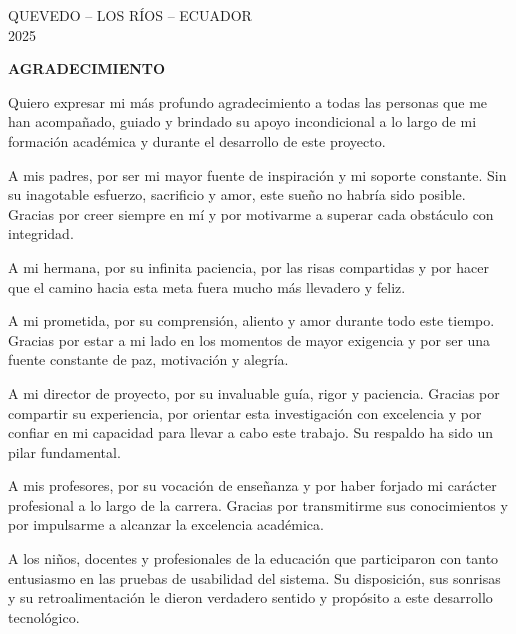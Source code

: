 \documentclass[12pt,a4paper,oneside]{report}
\begin{document}
\vspace{1.5cm}
\begin{center}
    QUEVEDO -- LOS RÍOS -- ECUADOR\\[0.3cm]
    2025
\end{center}

\newpage

\begin{center}
    \vspace*{0.5cm}
    {\bfseries AGRADECIMIENTO}
\end{center}
\vspace{0.8cm}

\justifying
Quiero expresar mi más profundo agradecimiento a todas las personas que me han acompañado, guiado y brindado su apoyo incondicional a lo largo de mi formación académica y durante el desarrollo de este proyecto.

A mis padres, por ser mi mayor fuente de inspiración y mi soporte constante. Sin su inagotable esfuerzo, sacrificio y amor, este sueño no habría sido posible. Gracias por creer siempre en mí y por motivarme a superar cada obstáculo con integridad.

A mi hermana, por su infinita paciencia, por las risas compartidas y por hacer que el camino hacia esta meta fuera mucho más llevadero y feliz.

A mi prometida, por su comprensión, aliento y amor durante todo este tiempo. Gracias por estar a mi lado en los momentos de mayor exigencia y por ser una fuente constante de paz, motivación y alegría.

A mi director de proyecto, por su invaluable guía, rigor y paciencia. Gracias por compartir su experiencia, por orientar esta investigación con excelencia y por confiar en mi capacidad para llevar a cabo este trabajo. Su respaldo ha sido un pilar fundamental.

A mis profesores, por su vocación de enseñanza y por haber forjado mi carácter profesional a lo largo de la carrera. Gracias por transmitirme sus conocimientos y por impulsarme a alcanzar la excelencia académica.

A los niños, docentes y profesionales de la educación que participaron con tanto entusiasmo en las pruebas de usabilidad del sistema. Su disposición, sus sonrisas y su retroalimentación le dieron verdadero sentido y propósito a este desarrollo tecnológico.
\end{document}
